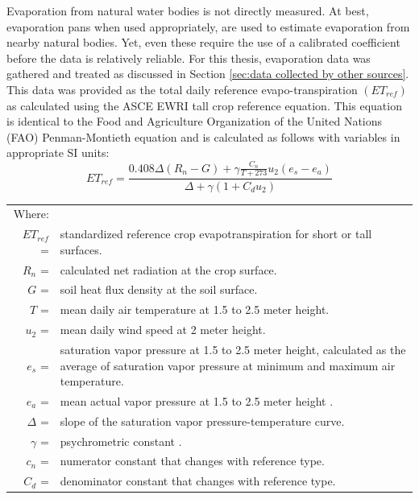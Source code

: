 \begin{linenumbers}
Evaporation from natural water bodies is not directly measured. At best, evaporation pans when used appropriately, are used to estimate evaporation from nearby natural bodies.  Yet, even these require the use of a calibrated coefficient before the data is relatively reliable.  For this thesis, evaporation data was gathered and treated as discussed in Section \ref{sec:data collected by other sources}.  This data was provided as the total daily reference evapo-transpiration $ \left( ET_{ref} \right) $ as calculated using the ASCE EWRI tall crop reference equation.  This equation is identical to the Food and Agriculture Organization of the United Nations (FAO) Penman-Montieth equation \parencite{walter2000asce,FAO56} and is calculated as follows with variables in appropriate SI units:
\begin{equation}
\label{eq:ET}
	ET_{ref}=\frac{0.408\Delta(R_n-G)+\gamma \displaystyle \frac{C_n}{T+273}u_2(e_s-e_a)}{\Delta+\gamma(1+C_d u_2)}
\end{equation}
\begin{tabular}{r p{5.5in}}
Where: &\\
$ET_{ref}$ =&standardized reference crop evapotranspiration for short or tall surfaces. \\
$R_n$ =&calculated net radiation at the crop surface. \\
$G$ =&soil heat flux density at the soil surface. \\
$T$ =&mean daily air temperature at 1.5 to 2.5 meter height. \\
$u_2$ =&mean daily wind speed at 2 meter height. \\
$e_s$ =&saturation vapor pressure at 1.5 to 2.5 meter height, calculated as the
average of saturation vapor pressure at minimum and maximum air temperature. \\
$e_a$ =&mean actual vapor pressure at 1.5 to 2.5 meter height . \\
$\Delta$ =&slope of the saturation vapor pressure-temperature curve. \\
$\gamma$ =&psychrometric constant . \\
$c_n$ =&numerator constant that changes with reference type. \\
$C_d$ =&denominator constant that changes with reference type. \\
\end{tabular}\\


\end{linenumbers}
